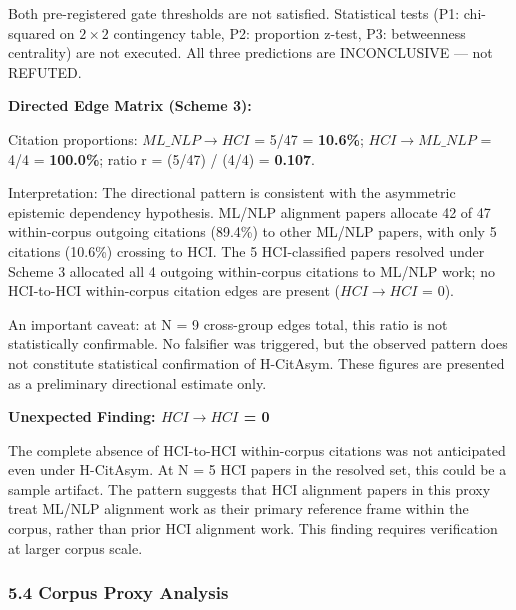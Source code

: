 Both pre-registered gate thresholds are not satisfied. Statistical tests (P1: chi-squared on $2\times 2$ contingency table, P2: proportion z-test, P3: betweenness centrality) are not executed. All three predictions are INCONCLUSIVE --- not REFUTED.

\textbf{Directed Edge Matrix (Scheme 3):}

\begin{table}[htbp]
\centering
{}
\end{table}

Citation proportions: $ML\_NLP\rightarrow HCI$ = 5/47 = \textbf{10.6\%}; $HCI\rightarrow ML\_NLP$ = 4/4 = \textbf{100.0\%}; ratio r = (5/47) / (4/4) = \textbf{0.107}.

Interpretation: The directional pattern is consistent with the asymmetric epistemic dependency hypothesis. ML/NLP alignment papers allocate 42 of 47 within-corpus outgoing citations (89.4\%) to other ML/NLP papers, with only 5 citations (10.6\%) crossing to HCI. The 5 HCI-classified papers resolved under Scheme 3 allocated all 4 outgoing within-corpus citations to ML/NLP work; no HCI-to-HCI within-corpus citation edges are present ($HCI\rightarrow HCI$ = 0).

An important caveat: at N = 9 cross-group edges total, this ratio is not statistically confirmable. No falsifier was triggered, but the observed pattern does not constitute statistical confirmation of H-CitAsym. These figures are presented as a preliminary directional estimate only.

\textbf{Unexpected Finding: $HCI\rightarrow HCI$ = 0}

The complete absence of HCI-to-HCI within-corpus citations was not anticipated even under H-CitAsym. At N = 5 HCI papers in the resolved set, this could be a sample artifact. The pattern suggests that HCI alignment papers in this proxy treat ML/NLP alignment work as their primary reference frame within the corpus, rather than prior HCI alignment work. This finding requires verification at larger corpus scale.

\subsubsection{5.4 Corpus Proxy Analysis}

